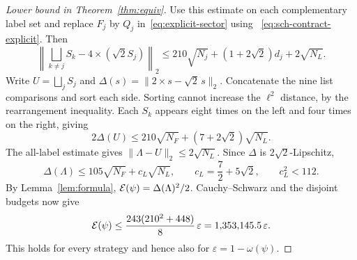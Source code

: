 \begin{proof}[Lower bound in Theorem~\ref{thm:equiv}]
Use this estimate on each complementary label set and replace $F_j$
by $Q_j$ in~\eqref{eq:explicit-sector} using
~\eqref{eq:sch-contract-explicit}. Then
\[
 \left\|\bigsqcup_{k\ne j}S_k-4\times(\sqrt2 S_j)\right\|_2
 \le 210\sqrt{N_j}+(1+2\sqrt2)d_j+2\sqrt{N_L}.
\]
Write $U=\bigsqcup_j S_j$ and
$\Delta(s)=\|2\times s-\sqrt2\,s\|_2$. Concatenate the nine list
comparisons and sort each side. Sorting cannot increase the
$\ell^2$ distance, by the rearrangement inequality. Each $S_k$
appears eight times on the left and four times on the right, giving
\[
 2\Delta(U)\le210\sqrt{N_F}+(7+2\sqrt2)\sqrt{N_L}.
\]
The all-label estimate gives $\|\Lambda-U\|_2\le2\sqrt{N_L}$.
Since $\Delta$ is $2\sqrt2$-Lipschitz,
\[
 \Delta(\Lambda)\le105\sqrt{N_F}+c_L\sqrt{N_L},\qquad
 c_L=\frac72+5\sqrt2,\qquad c_L^2<112 .
\]
By Lemma~\ref{lem:formula}, $\mathcal{E}(\psi)=\Delta(\Lambda)^2/2$.
Cauchy--Schwarz and the disjoint budgets now give
\[
 \mathcal{E}(\psi)\le \frac{243(210^2+448)}{8}\,\varepsilon
              =1{,}353{,}145.5\,\varepsilon .
\]
This holds for every strategy and hence also for
$\varepsilon=1-\omega(\psi)$.
\end{proof}
